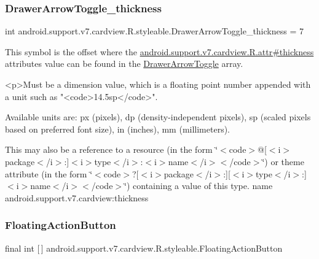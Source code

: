 \subsubsection{\texorpdfstring{Drawer\+Arrow\+Toggle\+\_\+thickness}{DrawerArrowToggle\_thickness}}
{\footnotesize\ttfamily int android.\+support.\+v7.\+cardview.\+R.\+styleable.\+Drawer\+Arrow\+Toggle\+\_\+thickness = 7\hspace{0.3cm}{\ttfamily [static]}}

This symbol is the offset where the \hyperlink{classandroid_1_1support_1_1v7_1_1cardview_1_1R_1_1attr_a6886117481f6f9c9efb4113aa9fc48fe}{android.\+support.\+v7.\+cardview.\+R.\+attr\#thickness} attribute\textquotesingle{}s value can be found in the \hyperlink{classandroid_1_1support_1_1v7_1_1cardview_1_1R_1_1styleable_a159ca17c520d2f2d93f6152d01b0b8df}{Drawer\+Arrow\+Toggle} array.

\begin{DoxyVerb}      <p>Must be a dimension value, which is a floating point number appended with a unit such as "<code>14.5sp</code>".
\end{DoxyVerb}
 Available units are\+: px (pixels), dp (density-\/independent pixels), sp (scaled pixels based on preferred font size), in (inches), mm (millimeters). 

This may also be a reference to a resource (in the form \char`\"{}$<$code$>$@\mbox{[}$<$i$>$package$<$/i$>$\+:\mbox{]}$<$i$>$type$<$/i$>$\+:$<$i$>$name$<$/i$>$$<$/code$>$\char`\"{}) or theme attribute (in the form \char`\"{}$<$code$>$?\mbox{[}$<$i$>$package$<$/i$>$\+:\mbox{]}\mbox{[}$<$i$>$type$<$/i$>$\+:\mbox{]}$<$i$>$name$<$/i$>$$<$/code$>$\char`\"{}) containing a value of this type.  name android.\+support.\+v7.\+cardview\+:thickness \mbox{\label{classandroid_1_1support_1_1v7_1_1cardview_1_1R_1_1styleable_a1be8c9bcabd399162362befcccf73f59}} 
\subsubsection{\texorpdfstring{Floating\+Action\+Button}{FloatingActionButton}}
{\footnotesize\ttfamily final int \mbox{[}$\,$\mbox{]} android.\+support.\+v7.\+cardview.\+R.\+styleable.\+Floating\+Action\+Button\hspace{0.3cm}{\ttfamily [static]}}


